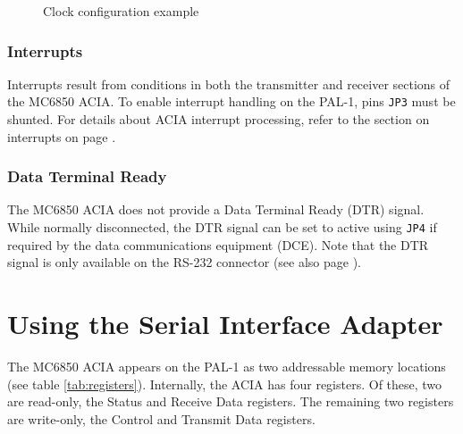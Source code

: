 \documentclass[a4paper,11pt,twoside,openright]{report}
\newcommand{\code}{\texttt}
\begin{document}
\begin{figure}[h!]
    \centering
    \caption{Clock configuration example}
    \label{fig:clkconfig}
\end{figure}

\subsection*{Interrupts}
\label{sec:configirq}
Interrupts result from conditions in both the transmitter and receiver sections of the MC6850 ACIA. To enable interrupt handling on the PAL-1, pins \code{JP3} must be shunted. For details about ACIA interrupt processing, refer to the section on interrupts on page \pageref{sec:interrupts}.  

\subsection*{Data Terminal Ready}
\label{sec:configdtr}
The MC6850 ACIA does not provide a Data Terminal Ready (DTR) signal. While normally disconnected, the DTR signal can be set to active using \code{JP4} if required by the data communications equipment (DCE). Note that the DTR signal is only available on the RS-232 connector (see also page \pageref{sec:connectors}).

\chapter{Using the Serial Interface Adapter}
The MC6850 ACIA appears on the PAL-1 as two addressable memory locations (see table \ref{tab:registers}).  Internally, the ACIA has four registers. Of these, two are read-only, the Status and Receive Data registers. The remaining two registers are write-only, the Control and Transmit Data registers. 
\end{document}
